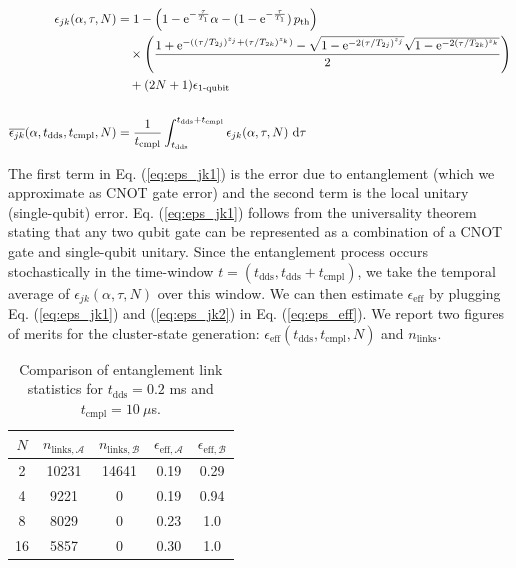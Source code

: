 \documentclass[%
 reprint,
 superscriptaddress,
 amsmath,amssymb,
 aps,
 prx,
]{revtex4-2}
\begin{document}
\begin{widetext}
  \begin{subequations}
  \label{Eq_e_ff}
\begin{align}
\epsilon_{jk}(\alpha, \tau,N) &=
 1 - \left(1 - \text{e}^{-\frac{\tau}{T_{1}}}\alpha 
- (1 - \text{e}^{-\frac{\tau}{T_{1}}})\,p_{\text{th}}\right)  \notag \\
&\quad  \times 
\left(\frac{1 +\text{e}^{-((\tau/T_{2j})^{z_{j}}+(\tau/T_{2k})^{z_{k}})} - \sqrt{1 - \text{e}^{-2(\tau/T_{2j})^{z_{j}}}}\sqrt{1 - \text{e}^{-2(\tau/T_{2k})^{z_{k}}}}}{2}\right) \notag \\
&\quad  + (2N+1)\epsilon_{1\text{-qubit}} \label{eq:eps_jk1}\\[1.5em]
\overline{\epsilon_{jk}}(\alpha, t_{\text{dds}}, t_{\text{cmpl}}, N) &= \frac{1}{t_{\text{cmpl}}}\int^{t_{\text{dds}}+t_{\text{cmpl}}}_{t_{\text{dds}}}\epsilon_{jk}(\alpha, \tau,N)~\text{d}\tau \label{eq:eps_jk2}
\end{align}
\end{subequations}
\end{widetext}
The first term in Eq. (\ref{eq:eps_jk1}) is the error due to entanglement (which we approximate as CNOT gate error) and the second term is the local unitary (single-qubit) error. Eq. (\ref{eq:eps_jk1}) follows from the universality theorem \cite{Nielsen_Chuang_2010} stating that any two qubit gate can be represented as a combination of a CNOT gate and single-qubit unitary. Since the entanglement process occurs stochastically in the time-window $t=(t_{\text{dds}}, t_{\text{dds}}+t_{\text{cmpl}})$, we take the temporal average of $\epsilon_{jk}(\alpha, \tau,N)$ over this window. We can then estimate $\epsilon_{\text{eff}}$ by plugging Eq. (\ref{eq:eps_jk1}) and (\ref{eq:eps_jk2}) in Eq. (\ref{eq:eps_eff}). We report two figures of merits for the cluster-state generation: $\epsilon_{\text{eff}}(t_{\text{dds}}, t_{\text{cmpl}}, N)$ and $n_{\text{links}}$.
\begin{table}[h]
\centering
\caption{Comparison of entanglement link statistics for  $t_{\text{dds}}=0.2$ ms and $t_{\text{cmpl}}=10~\mu$s.
}
\begin{tabular}{|c| c| c | c | c|}
\hline
$N$ & $n_{\text{links},\mathcal{A}}$ & $n_{\text{links},\mathcal{B}}$ & $\epsilon_{\text{eff},\mathcal{A}}$ & $\epsilon_{\text{eff},\mathcal{B}}$\\
\hline
\rule{0pt}{2.5ex}
2   & 10231  & 14641 & 0.19 & 0.29\\
\hline
\rule{0pt}{2.5ex}
4   & 9221  & 0 & 0.19 & 0.94\\
\hline
\rule{0pt}{2.5ex}
8   & 8029  & 0 & 0.23 & 1.0\\
\hline
\rule{0pt}{2.5ex}
16   & 5857  & 0 & 0.30 & 1.0\\
\hline
\end{tabular}
\label{tab:qv_comparison1}
\end{table}
\end{document}

